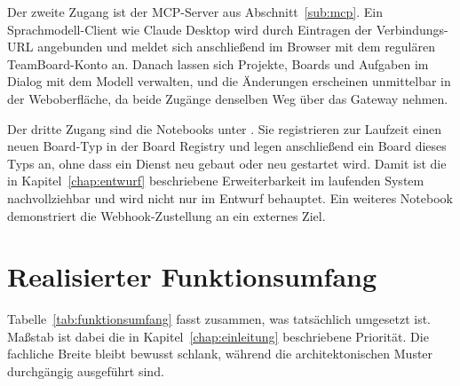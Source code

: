Der zweite Zugang ist der MCP-Server aus Abschnitt~\vref{sub:mcp}. Ein Sprachmodell-Client wie Claude Desktop wird durch Eintragen der Verbindungs-URL angebunden und meldet sich anschließend im Browser mit dem regulären TeamBoard-Konto an. Danach lassen sich Projekte, Boards und Aufgaben im Dialog mit dem Modell verwalten, und die Änderungen erscheinen unmittelbar in der Weboberfläche, da beide Zugänge denselben Weg über das Gateway nehmen.

Der dritte Zugang sind die Notebooks unter . Sie registrieren zur Laufzeit einen neuen Board-Typ in der Board Registry und legen anschließend ein Board dieses Typs an, ohne dass ein Dienst neu gebaut oder neu gestartet wird. Damit ist die in Kapitel~\vref{chap:entwurf} beschriebene Erweiterbarkeit im laufenden System nachvollziehbar und wird nicht nur im Entwurf behauptet. Ein weiteres Notebook demonstriert die Webhook-Zustellung an ein externes Ziel.

\section{Realisierter Funktionsumfang}
\label{sec:funktionsumfang}

Tabelle~\vref{tab:funktionsumfang} fasst zusammen, was tatsächlich umgesetzt ist. Maßstab ist dabei die in Kapitel~\vref{chap:einleitung} beschriebene Priorität. Die fachliche Breite bleibt bewusst schlank, während die architektonischen Muster durchgängig ausgeführt sind.

